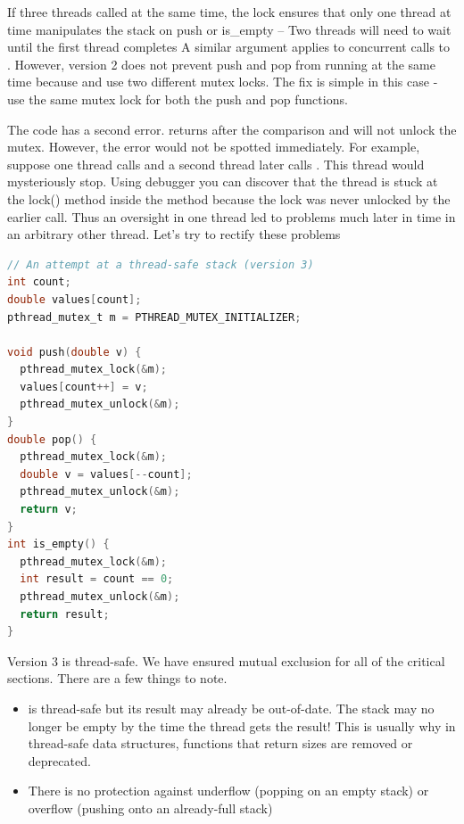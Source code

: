 If three threads called  at the same time, the lock  ensures that only one thread at time manipulates the stack on push or is\_empty -- Two threads will need to wait until the first thread completes
A similar argument applies to concurrent calls to .
However, version 2 does not prevent push and pop from running at the same time because  and  use two different mutex locks.
The fix is simple in this case - use the same mutex lock for both the push and pop functions.

The code has a second error.
 returns after the comparison and will not unlock the mutex.
However, the error would not be spotted immediately.
For example, suppose one thread calls  and a second thread later calls .
This thread would mysteriously stop.
Using debugger you can discover that the thread is stuck at the lock() method inside the  method because the lock was never unlocked by the earlier  call.
Thus an oversight in one thread led to problems much later in time in an arbitrary other thread.
Let's try to rectify these problems

\begin{lstlisting}[language=C]
// An attempt at a thread-safe stack (version 3)
int count;
double values[count];
pthread_mutex_t m = PTHREAD_MUTEX_INITIALIZER;

void push(double v) {
  pthread_mutex_lock(&m);
  values[count++] = v;
  pthread_mutex_unlock(&m);
}
double pop() {
  pthread_mutex_lock(&m);
  double v = values[--count];
  pthread_mutex_unlock(&m);
  return v;
}
int is_empty() {
  pthread_mutex_lock(&m);
  int result = count == 0;
  pthread_mutex_unlock(&m);
  return result;
}
\end{lstlisting}

Version 3 is thread-safe.
We have ensured mutual exclusion for all of the critical sections.
There are a few things to note.

\begin{itemize}
\item {} is thread-safe but its result may already be out-of-date.
  The stack may no longer be empty by the time the thread gets the result!
  This is usually why in thread-safe data structures, functions that return sizes are removed or deprecated.
  \item There is no protection against underflow (popping on an empty stack) or overflow (pushing onto an already-full stack)
\end{itemize}


